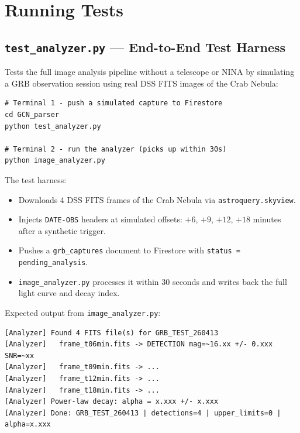 \documentclass[12pt,a4paper]{article}
\begin{document}
\section{Running Tests}

\subsection{\texttt{test\_analyzer.py} --- End-to-End Test Harness}

Tests the full image analysis pipeline without a telescope or NINA by
simulating a GRB observation session using real DSS FITS images of the
Crab Nebula:

\begin{lstlisting}[style=python, caption={Run the test harness}]
# Terminal 1 - push a simulated capture to Firestore
cd GCN_parser
python test_analyzer.py

# Terminal 2 - run the analyzer (picks up within 30s)
python image_analyzer.py
\end{lstlisting}

The test harness:
\begin{itemize}
    \item Downloads 4 DSS FITS frames of the Crab Nebula via
          \texttt{astroquery.skyview}.
    \item Injects \texttt{DATE-OBS} headers at simulated offsets:
          $+6$, $+9$, $+12$, $+18$ minutes after a synthetic trigger.
    \item Pushes a \texttt{grb\_captures} document to Firestore with
          \texttt{status = pending\_analysis}.
    \item \texttt{image\_analyzer.py} processes it within 30 seconds and
          writes back the full light curve and decay index.
\end{itemize}

Expected output from \texttt{image\_analyzer.py}:

\begin{lstlisting}[style=bash]
[Analyzer] Found 4 FITS file(s) for GRB_TEST_260413
[Analyzer]   frame_t06min.fits -> DETECTION mag=~16.xx +/- 0.xxx SNR=~xx
[Analyzer]   frame_t09min.fits -> ...
[Analyzer]   frame_t12min.fits -> ...
[Analyzer]   frame_t18min.fits -> ...
[Analyzer] Power-law decay: alpha = x.xxx +/- x.xxx
[Analyzer] Done: GRB_TEST_260413 | detections=4 | upper_limits=0 | alpha=x.xxx
\end{lstlisting}
\end{document}
